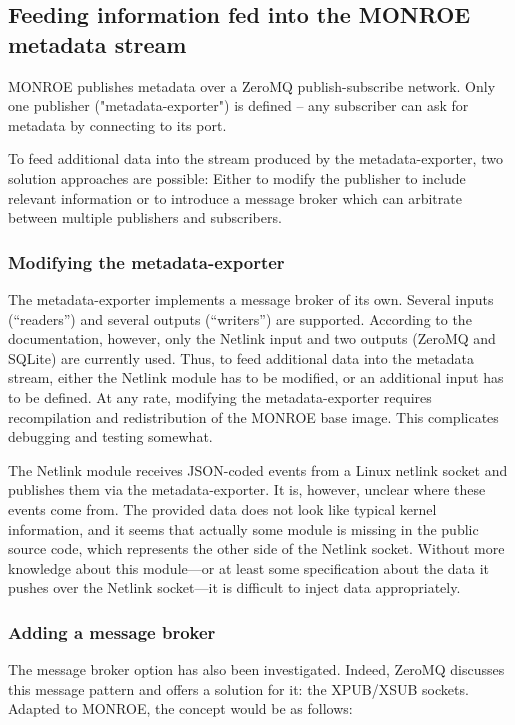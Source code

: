 \documentclass{scrartcl}
\begin{document}
\subsection*{Feeding information fed into the MONROE metadata stream}

MONROE publishes metadata over a ZeroMQ publish-subscribe network. Only one
publisher ("metadata-exporter") is defined -- any subscriber can ask for
metadata by connecting to its port.

To feed additional data into the stream produced by the metadata-exporter,
two solution approaches are possible: Either to modify the publisher to include
relevant information or to introduce a message broker which can arbitrate
between multiple publishers and subscribers.

\subsubsection*{Modifying the metadata-exporter}

The metadata-exporter implements a message broker of its own. Several inputs
(``readers'') and several outputs (``writers'') are supported. According to the
documentation, however, only the Netlink input and two outputs (ZeroMQ and
SQLite) are currently used. Thus, to feed additional data into the metadata
stream, either the Netlink module has to be modified, or an additional input
has to be defined. At any rate, modifying the metadata-exporter requires
recompilation and redistribution of the MONROE base image. This complicates
debugging and testing somewhat.

The Netlink module receives JSON-coded events from a Linux netlink socket and
publishes them via the metadata-exporter. It is, however, unclear where these
events come from. The provided data does not look like typical kernel
information, and it seems that actually some module is missing in the public
source code, which represents the other side of the Netlink socket. Without more
knowledge about this module---or at least some specification about the data it
pushes over the Netlink socket---it is difficult to inject data appropriately.

\subsubsection*{Adding a message broker}

The message broker option has also been investigated. Indeed, ZeroMQ discusses this
message pattern and offers a solution for it: the XPUB/XSUB sockets. Adapted to
MONROE, the concept would be as follows:
\end{document}
